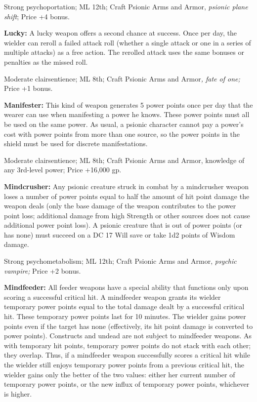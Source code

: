 \documentclass{article}
\begin{document}
Strong psychoportation; ML 12th; Craft Psionic Arms and Armor, \textit{psionic 
plane shift}; Price +4 bonus.

\textbf{Lucky:} A lucky weapon offers a second chance at success. Once per day, 
the wielder can reroll a failed attack roll (whether a single attack or one in 
a series of multiple attacks) as a free action. The rerolled attack uses the same 
bonuses or penalties as the missed roll.

Moderate clairsentience; ML 8th; Craft Psionic Arms and Armor\textit{, fate of 
one; }Price +1 bonus.

\textbf{Manifester:} This kind of weapon generates 5 power points once per day 
that the wearer can use when manifesting a power he knows. These power points must 
all be used on the same power. As usual, a psionic character cannot pay a power's 
cost with power points from more than one source, so the power points in the shield 
must be used for discrete manifestations.

Moderate clairsentience; ML 8th; Craft Psionic Arms and Armor, knowledge of any 
3rd-level power; Price +16,000 gp.

\textbf{Mindcrusher:} Any psionic creature struck in combat by a mindcrusher weapon 
loses a number of power points equal to half the amount of hit point damage the 
weapon deals (only the base damage of the weapon contributes to the power point 
loss; additional damage from high Strength or other sources does not cause additional 
power point loss). A psionic creature that is out of power points (or has none) 
must succeed on a DC 17 Will save or take 1d2 points of Wisdom damage.

Strong psychometabolism; ML 12th; Craft Psionic Arms and Armor, \textit{psychic 
vampire; }Price +2 bonus.

\textbf{Mindfeeder: }All feeder weapons have a special ability that functions only 
upon scoring a successful critical hit. A mindfeeder weapon grants its wielder 
temporary power points equal to the total damage dealt by a successful critical 
hit. These temporary power points last for 10 minutes. The wielder gains power 
points even if the target has none (effectively, its hit point damage is converted 
to power points). Constructs and undead are not subject to mindfeeder weapons. 
As with temporary hit points, temporary power points do not stack with each other; 
they overlap. Thus, if a mindfeeder weapon successfully scores a critical hit while 
the wielder still enjoys temporary power points from a previous critical hit, the 
wielder gains only the better of the two values: either her current number of temporary 
power points, or the new influx of temporary power points, whichever is higher.
\end{document}
